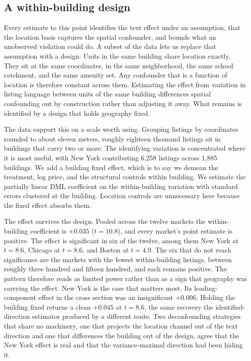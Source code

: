 \subsection{A within-building design}
\label{sec:within-building}

Every estimate to this point identifies the text effect under an assumption, that
the location basis captures the spatial confounder, and bounds what an unobserved
violation could do. A subset of the data lets us replace that assumption with a
design. Units in the same building share location exactly. They sit at the same
coordinates, in the same neighborhood, the same school catchment, and the same
amenity set. Any confounder that is a function of location is therefore constant across
them. Estimating the effect from variation in listing language between units of the
same building differences spatial confounding out by construction rather
than adjusting it away. What remains is identified by a design that holds
geography fixed.

The data support this on a scale worth using. Grouping listings by coordinates
rounded to about eleven meters, roughly eighteen thousand listings sit in buildings
that carry two or more. The identifying variation is concentrated where it is
most useful, with New York contributing 6{,}258 listings across 1{,}885 buildings.
We add a building fixed effect, which is to say we demean the treatment, log price,
and the structural controls within building. We estimate the partially linear DML
coefficient on the within-building variation with standard errors clustered at the
building. Location controls are unnecessary here because the fixed effect absorbs
them.

The effect survives the design. Pooled across the twelve markets the within-building
coefficient is $+0.035$ ($t=10.8$), and every market's point estimate is positive. The
effect is significant in six of the twelve, among them New York at $t=8.6$,
Chicago at $t=8.6$, and Boston at $t=4.9$. The six that do not reach significance
are the markets with the fewest within-building listings, between roughly three
hundred and fifteen hundred, and each remains positive. The pattern therefore reads as
limited power rather than as a sign that geography was carrying the effect. New York
is the case that matters most. Its leading-component effect in the cross section was
an insignificant $+0.006$. Holding the building fixed returns a clean $+0.045$
at $t=8.6$, the same recovery the identified-direction estimator produced by a
different route. Two deconfounding strategies that share no machinery, one that
projects the location channel out of the text direction and one that differences the
building out of the design, agree that the New York effect is real and that the
variance-maximal direction had been hiding it.

